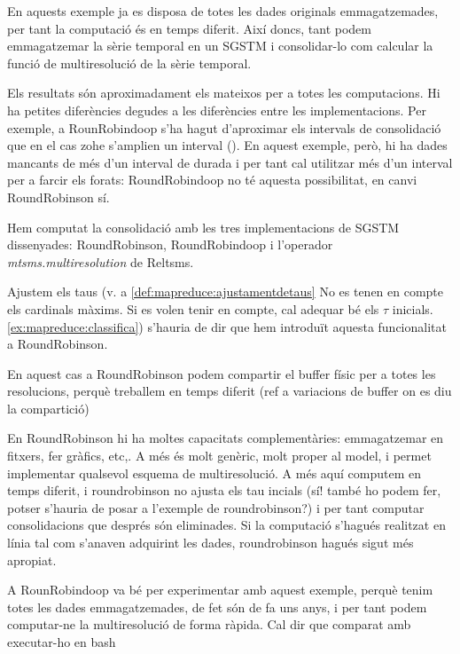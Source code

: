 
En aquests exemple ja es disposa de totes les dades originals
emmagatzemades, per tant la computació és en temps diferit.  Així
doncs, tant podem emmagatzemar la sèrie temporal en un \gls{SGSTM} i
consolidar-lo com calcular la funció de multiresolució de la sèrie
temporal. 


Els resultats són aproximadament els mateixos per a totes les
computacions. Hi ha petites diferències degudes a les diferències
entre les implementacions. Per exemple, a RounRobindoop s'ha hagut
d'aproximar els intervals de consolidació que en el cas \gls{zohe}
s'amplien un interval (). En aquest
exemple, però, hi ha dades mancants de més d'un interval de durada i
per tant cal utilitzar més d'un interval per a farcir els forats:
RoundRobindoop no té aquesta possibilitat, en canvi RoundRobinson sí.



Hem computat la consolidació amb les tres implementacions de
\gls{SGSTM} dissenyades: RoundRobinson, RoundRobindoop i l'operador
\emph{mtsms.multiresolution} de Reltsms.



Ajustem els taus (v. a \autoref{def:mapreduce:ajustamentdetaus}
No es tenen en compte els cardinals màxims. Si es volen tenir en
  compte, cal adequar bé els $\tau$ inicials.  \autoref{ex:mapreduce:classifica}) s'hauria de dir que hem introduït aquesta funcionalitat a RoundRobinson.



En aquest cas a RoundRobinson podem compartir el buffer físic per a totes les resolucions, perquè treballem en temps diferit (ref a variacions de buffer on es diu la compartició)


En RoundRobinson hi ha moltes capacitats complementàries: emmagatzemar en fitxers, fer gràfics, etc,. A més és molt genèric, molt proper al model, i permet implementar qualsevol esquema de multiresolució.
A més aquí computem en temps diferit, i roundrobinson no ajusta els tau incials (sí! també ho podem fer, potser s'hauria de posar a l'exemple de roundrobinson?) i per tant computar consolidacions que després són eliminades.
Si la computació s'hagués realitzat en línia tal com s'anaven adquirint les dades, roundrobinson hagués sigut més apropiat.


A RounRobindoop va bé per experimentar amb aquest exemple, perquè tenim totes les dades emmagatzemades, de fet són de fa uns anys, i per tant podem computar-ne la multiresolució de forma ràpida.
Cal dir que comparat amb executar-ho en bash



